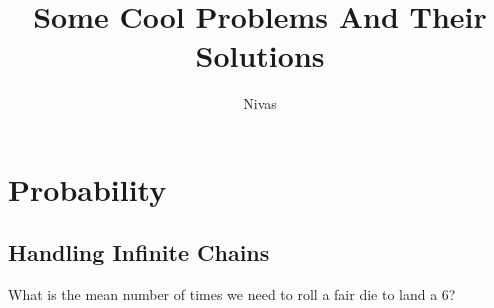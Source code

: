 \documentclass[reqno]{amsart}
\title{Some Cool Problems And Their Solutions}
\author{Nivas}
\begin{document}
\maketitle
\newpage
\section{Probability}
\subsection{Handling Infinite Chains}
What is the mean number of times we need to roll a fair die to land a 6?
\end{document}

